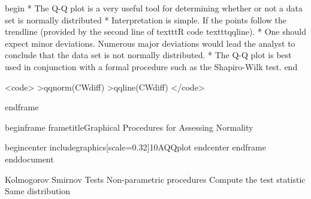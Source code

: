 begin{ }
         * The Q-Q plot is a very useful tool for determining whether or not a data set is normally distributed
         * Interpretation is simple. If the points follow the trendline (provided by the second line of texttt{R} code texttt{qqline}).
         * One should expect minor deviations. Numerous major deviations would lead the analyst to conclude that the data set is not normally distributed.
         * The Q-Q plot is best used in conjunction with a formal procedure such as the Shapiro-Wilk test.
end{ }

<code>
>qqnorm(CWdiff)
>qqline(CWdiff)
</code>

end{frame}


begin{frame}
frametitle{Graphical Procedures for Assessing Normality}

begin{center}
includegraphics[scale=0.32]{10AQQplot}
end{center}
end{frame}
end{document}


Kolmogorov Smirnov Tests
Non-parametric procedures
Compute the test statistic
Same distribution
